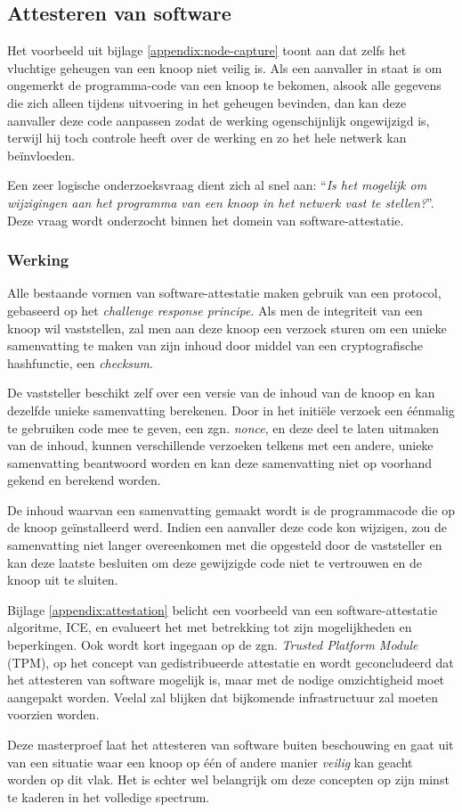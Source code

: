 
\subsection{Attesteren van software}
\label{subsection:attestation}

Het voorbeeld uit bijlage \ref{appendix:node-capture} toont aan dat zelfs het
vluchtige geheugen van een knoop niet veilig is. Als een aanvaller in staat is
om ongemerkt de programma-code van een knoop te bekomen, alsook alle gegevens
die zich alleen tijdens uitvoering in het geheugen bevinden, dan kan deze
aanvaller deze code aanpassen zodat de werking ogenschijnlijk ongewijzigd is,
terwijl hij toch controle heeft over de werking en zo het hele netwerk kan
be\"invloeden.

Een zeer logische onderzoeksvraag dient zich al snel aan: ``\emph{Is het
mogelijk om wijzigingen aan het programma van een knoop in het netwerk vast te
stellen?}''. Deze vraag wordt onderzocht binnen het domein van
software-attestatie.

\subsubsection*{Werking}

Alle bestaande vormen van software-attestatie maken gebruik van een protocol,
gebaseerd op het \emph{challenge response principe}. Als men de integriteit van
een knoop wil vaststellen, zal men aan deze knoop een verzoek sturen om een
unieke samenvatting te maken van zijn inhoud door middel van een
cryptografische hashfunctie, een \emph{checksum}.

De vaststeller beschikt zelf over een versie van de inhoud van de knoop en kan
dezelfde unieke samenvatting berekenen. Door in het initi\"ele verzoek een
\'e\'enmalig te gebruiken code mee te geven, een zgn. \emph{nonce}, en deze
deel te laten uitmaken van de inhoud, kunnen verschillende verzoeken telkens
met een andere, unieke samenvatting beantwoord worden en kan deze samenvatting
niet op voorhand gekend en berekend worden.

De inhoud waarvan een samenvatting gemaakt wordt is de programmacode die op de
knoop ge\"installeerd werd. Indien een aanvaller deze code kon wijzigen, zou de
samenvatting niet langer overeenkomen met die opgesteld door de vaststeller en
kan deze laatste besluiten om deze gewijzigde code niet te vertrouwen en de
knoop uit te sluiten.

Bijlage \ref{appendix:attestation} belicht een voorbeeld van een
software-attestatie algoritme, ICE, en evalueert het met betrekking tot zijn
mogelijkheden en beperkingen. Ook wordt kort ingegaan op de zgn. \emph{Trusted
Platform Module} (TPM), op het concept van gedistribueerde attestatie en wordt
geconcludeerd dat het attesteren van software mogelijk is, maar met de nodige
omzichtigheid moet aangepakt worden. Veelal zal blijken dat bijkomende
infrastructuur zal moeten voorzien worden.

Deze masterproef laat het attesteren van software buiten beschouwing en gaat
uit van een situatie waar een knoop op \'e\'en of andere manier \emph{veilig}
kan geacht worden op dit vlak. Het is echter wel belangrijk om deze concepten
op zijn minst te kaderen in het volledige spectrum.
